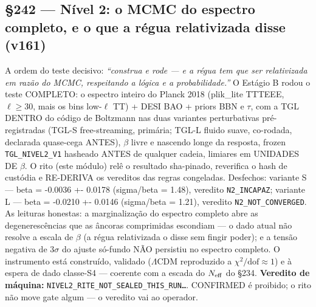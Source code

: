 \documentclass[11pt]{article}
\theoremstyle{definition}\newtheorem{deriv}{Derivação}
\begin{document}
\subsection*{\S242 --- Nível 2: o MCMC do espectro completo, e o que a régua relativizada disse (v161)}A ordem do teste decisivo: \emph{``construa e rode --- e a régua tem que ser relativizada em razão do MCMC, respeitando a lógica e a probabilidade.''} O Estágio B rodou o teste COMPLETO: o espectro inteiro do Planck 2018 (plik\_lite TTTEEE, $\ell{\geq}30$, mais os bins low-$\ell$ TT) + DESI BAO + priors BBN e $\tau$, com a TGL DENTRO do código de Boltzmann nas duas variantes perturbativas pré-registradas (TGL-S free-streaming, primária; TGL-L fluido suave, co-rodada, declarada quase-cega ANTES), $\beta$ livre e nascendo longe da resposta, frozen \texttt{TGL\_NIVEL2\_V1} hasheado ANTES de qualquer cadeia, limiares em UNIDADES DE $\beta$. O rito (este módulo) relê o resultado sha-pinado, reverifica o hash de custódia e RE-DERIVA os vereditos das regras congeladas. Desfechos: variante S --- beta = -0.0036 +- 0.0178 (sigma/beta = 1.48), veredito \texttt{N2\_INCAPAZ}; variante L --- beta = -0.0210 +- 0.0146 (sigma/beta = 1.21), veredito \texttt{N2\_NOT\_CONVERGED}. As leituras honestas: a marginalização do espectro completo abre as degenerescências que as âncoras comprimidas escondiam --- o dado atual não resolve a escala de $\beta$ (a régua relativizada o disse sem fingir poder); e a tensão negativa de $3\sigma$ do ajuste só-fundo NÃO persistiu no espectro completo. O instrumento está construído, validado ($\Lambda$CDM reproduzido a $\chi^2/\mathrm{dof}{\approx}1$) e à espera de dado classe-S4 --- coerente com a escada do $N_{\rm eff}$ do \S234. \textbf{Veredito de máquina:} \texttt{NIVEL2\_RITE\_NOT\_SEALED\_THIS\_RUN\ldots}. CONFIRMED é proibido; o rito não move gate algum --- o veredito vai ao operador.
\end{document}
